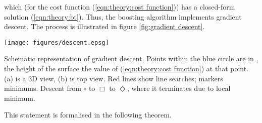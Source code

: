 which (for the cost function (\ref{eqn:theory:cost
function})) has a closed-form solution  (\ref{eqn:theory:bt}).  Thus, the
boosting algorithm implements gradient descent.  The process is
illustrated in figure \ref{fig:gradient descent}.

\begin{linefigure}
\begin{center}
\texttt{[image: figures/descent.epsg]}
\end{center}
\begin{capt}{Schematic representation of gradient descent.}
Points within the blue circle are in \calF, the height of the surface
the value of (\ref{eqn:theory:cost function}) at that point.  (a) is a
3D view, (b) is top view. Red lines show line searches; markers
minimums.  Descent from $\circ$ to $\Box$ to $\Diamond$, where it
terminates due to local minimum.
\end{capt}
\label{fig:gradient descent}
\end{linefigure}

This statement is formalised in the following theorem.

